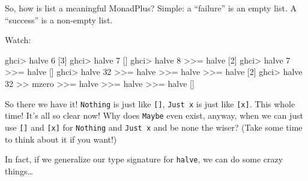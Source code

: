 \documentclass[]{article}
\newenvironment{Shaded}{}{}
\newcommand{\CommentTok}[1]{\textcolor[rgb]{0.38,0.63,0.69}{\textit{#1}}}
\newcommand{\DataTypeTok}[1]{\textcolor[rgb]{0.56,0.13,0.00}{#1}}
\newcommand{\DecValTok}[1]{\textcolor[rgb]{0.25,0.63,0.44}{#1}}
\newcommand{\FunctionTok}[1]{\textcolor[rgb]{0.02,0.16,0.49}{#1}}
\newcommand{\KeywordTok}[1]{\textcolor[rgb]{0.00,0.44,0.13}{\textbf{#1}}}
\newcommand{\NormalTok}[1]{#1}
\newcommand{\OperatorTok}[1]{\textcolor[rgb]{0.40,0.40,0.40}{#1}}
\newcommand{\OtherTok}[1]{\textcolor[rgb]{0.00,0.44,0.13}{#1}}
\begin{document}
So, how is list a meaningful MonadPlus? Simple: a ``failure'' is an empty list.
A ``success'' is a non-empty list.

Watch:

\begin{Shaded}
\begin{Highlighting}[]
\NormalTok{ghci}\OperatorTok{>}\NormalTok{ halve\textquotesingle{} }\DecValTok{6}
\NormalTok{[}\DecValTok{3}\NormalTok{]}
\NormalTok{ghci}\OperatorTok{>}\NormalTok{ halve\textquotesingle{} }\DecValTok{7}
\NormalTok{[]}
\NormalTok{ghci}\OperatorTok{>}\NormalTok{ halve\textquotesingle{} }\DecValTok{8} \OperatorTok{>>=}\NormalTok{ halve\textquotesingle{}}
\NormalTok{[}\DecValTok{2}\NormalTok{]}
\NormalTok{ghci}\OperatorTok{>}\NormalTok{ halve\textquotesingle{} }\DecValTok{7} \OperatorTok{>>=}\NormalTok{ halve\textquotesingle{}}
\NormalTok{[]}
\NormalTok{ghci}\OperatorTok{>}\NormalTok{ halve\textquotesingle{} }\DecValTok{32} \OperatorTok{>>=}\NormalTok{ halve\textquotesingle{} }\OperatorTok{>>=}\NormalTok{ halve\textquotesingle{} }\OperatorTok{>>=}\NormalTok{ halve\textquotesingle{}}
\NormalTok{[}\DecValTok{2}\NormalTok{]}
\NormalTok{ghci}\OperatorTok{>}\NormalTok{ halve\textquotesingle{} }\DecValTok{32} \OperatorTok{>>}\NormalTok{ mzero }\OperatorTok{>>=}\NormalTok{ halve\textquotesingle{} }\OperatorTok{>>=}\NormalTok{ halve\textquotesingle{} }\OperatorTok{>>=}\NormalTok{ halve\textquotesingle{}}
\NormalTok{[]}
\end{Highlighting}
\end{Shaded}

So there we have it! \texttt{Nothing} is just like \texttt{{[}{]}},
\texttt{Just\ x} is just like \texttt{{[}x{]}}. This whole time! It's all so
clear now! Why does \texttt{Maybe} even exist, anyway, when we can just use
\texttt{{[}{]}} and \texttt{{[}x{]}} for \texttt{Nothing} and \texttt{Just\ x}
and be none the wiser? (Take some time to think about it if you want!)

In fact, if we generalize our type signature for \texttt{halve}, we can do some
crazy things\ldots{}

\begin{Shaded}
\end{Shaded}
\end{document}

